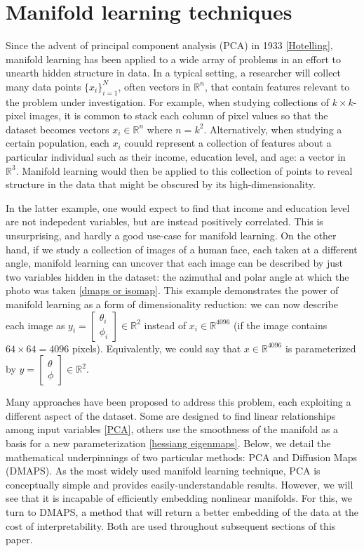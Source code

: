 \section{Manifold learning techniques \label{sec:ml}}

Since the advent of principal component analysis (PCA) in 1933
\ref{Hotelling}, manifold learning has been applied to a wide array of
problems in an effort to unearth hidden structure in data. In a
typical setting, a researcher will collect many data points
$\{x_i\}_{i=1}^N$, often vectors in $\mathbb{R}^n$, that contain
features relevant to the problem under investigation. For example,
when studying collections of $k \times k$-pixel images, it is common
to stack each column of pixel values so that the dataset becomes
vectors $x_i \in \mathbb{R}^n$ where $n = k^2$. Alternatively, when
studying a certain population, each $x_i$ couuld represent a
collection of features about a particular individual such as their
income, education level, and age: a vector in $\mathbb{R}^3$. Manifold
learning would then be applied to this collection of points to reveal
structure in the data that might be obscured by its
high-dimensionality. 

In the latter example, one would expect to find
that income and education level are not indepedent variables, but are
instead positively correlated. This is unsurprising, and hardly a good
use-case for manifold learning. On the other hand, if we study a
collection of images of a human face, each taken at a different angle,
manifold learning can uncover that each image can be described by just
two variables hidden in the dataset: the azimuthal and polar angle at
which the photo was taken \ref{dmaps or isomap}. This example
demonstrates the power of manifold learning as a form of
dimensionality reduction: we can now describe each image as $y_i =
\begin{bmatrix} \theta_i \\ \phi_i \end{bmatrix} \in \mathbb{R}^2$
instead of $x_i \in \mathbb{R}^{4096}$ (if the image contains
$64 \times 64 = 4096$ pixels).  Equivalently, we could say that
$x \in \mathbb{R}^{4096}$ is parameterized by $y = \begin{bmatrix}
  \theta \\ \phi \end{bmatrix} \in \mathbb{R}^2$.

Many approaches have been proposed to address this problem, each
exploiting a different aspect of the dataset. Some are designed to
find linear relationships among input variables \ref{PCA}, others use
the smoothness of the manifold as a basis for a new parameterization
\ref{hessiang eigenmaps}. Below, we detail the mathematical
underpinnings of two particular methods: PCA and Diffusion Maps
(DMAPS). As the most widely used manifold learning technique, PCA is
conceptually simple and provides easily-understandable
results. However, we will see that it is incapable of efficiently
embedding nonlinear manifolds. For this, we turn to DMAPS, a method
that will return a better embedding of the data at the cost of
interpretability. Both are used throughout subsequent sections of this
paper.

